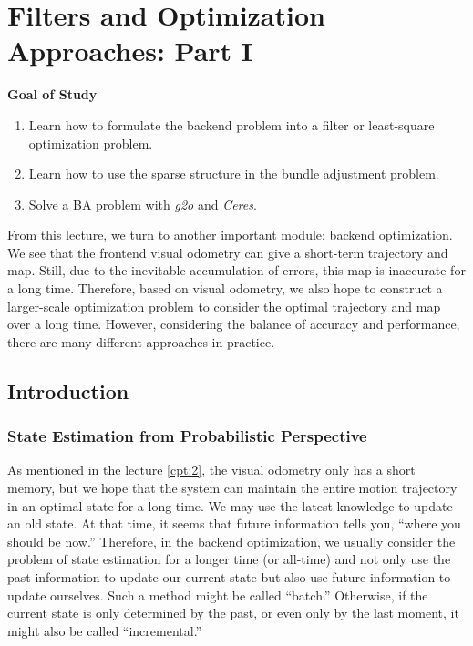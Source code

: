 \chapter{Filters and Optimization Approaches: Part I}
\label{cpt:backend1}
\label{cpt:9}
\begin{mdframed}  
	\textbf{Goal of Study}
	\begin{enumerate}[labelindent=0em,leftmargin=1.5em]
		\item Learn how to formulate the backend problem into a filter or least-square optimization problem.
		\item Learn how to use the sparse structure in the bundle adjustment problem. 
		\item Solve a BA problem with \textit{g2o} and \textit{Ceres}.
	\end{enumerate}
\end{mdframed}

From this lecture, we turn to another important module: backend optimization.
We see that the frontend visual odometry can give a short-term trajectory and map. Still, due to the inevitable accumulation of errors, this map is inaccurate for a long time. Therefore, based on visual odometry, we also hope to construct a larger-scale optimization problem to consider the optimal trajectory and map over a long time. However, considering the balance of accuracy and performance, there are many different approaches in practice.

\newpage


\newpage
\section{Introduction}
\subsection{State Estimation from Probabilistic Perspective}
As mentioned in the lecture \ref{cpt:2}, the visual odometry only has a short memory, but we hope that the system can maintain the entire motion trajectory in an optimal state for a long time. We may use the latest knowledge to update an old state. At that time, it seems that future information tells you, ``where you should be now.'' Therefore, in the backend optimization, we usually consider the problem of state estimation for a longer time (or all-time) and not only use the past information to update our current state but also use future information to update ourselves. Such a method might be called ``batch.'' Otherwise, if the current state is only determined by the past, or even only by the last moment, it might also be called ``incremental.''

